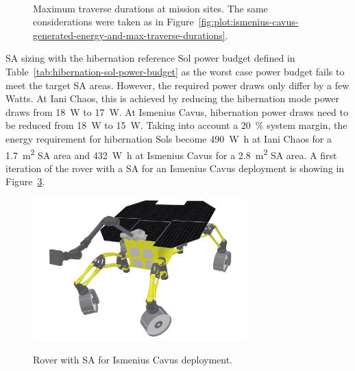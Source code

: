 \documentclass[twocolumn,letterpaper]{IEEEAerospaceCLS}  %
\newcommand{\refFig}[1]{{Figure}~\ref{#1}} %
\newcommand{\refTab}[1]{{Table}~\ref{#1}}  %
\newlength{\subfigureWidth}
\begin{document}
\begin{figure}[h]
\begin{subfigure}[t]{\subfigureWidth}
    \label{fig:plot:sub:final-maximum-traverse-durations-ismenius-cavus}
  \end{subfigure}\\[0.8ex]
  \caption{Maximum traverse durations at mission sites. The same considerations were taken as in \refFig{fig:plot:ismenius-cavus-generated-energy-and-max-traverse-durations}.}
  \label{fig:plot:final-maximum-traverse-durations-at-missions-sites}
\end{figure}

\ac{SA} sizing with the hibernation reference Sol power budget defined in \refTab{tab:hibernation-sol-power-budget} as the worst case power budget fails to meet the target \ac{SA} areas. However, the required power draws only differ by a few Watts. At Iani Chaos, this is achieved by reducing the hibernation mode power draws from \SI{18}{\watt} to \SI{17}{\watt}. At Ismenius Cavus, hibernation power draws need to be reduced from \SI{18}{\watt} to \SI{15}{\watt}. Taking into account a \SI{20}{\percent} system margin, the energy requirement for hibernation Sols become \SI{490}{\watt\hour} at Iani Chaos for a \SI{1.7}{m^{2}} \ac{SA} area and \SI{432}{\watt\hour} at Ismenius Cavus for a \SI{2.8}{m^{2}} \ac{SA} area. A first iteration of the rover with a \ac{SA} for an Ismenius Cavus deployment is showing in \refFig{fig:solar-array-on-ismenius-cavus-chaos}.


\begin{figure}[h]
 \centering
 \includegraphics[width=3.25in]{figures/images/ismenius-cavus-10deg-pitch.png}\\
 \caption{Rover with \ac{SA} for Ismenius Cavus deployment.}
 \label{fig:solar-array-on-ismenius-cavus-chaos}
\end{figure}



\end{document}
